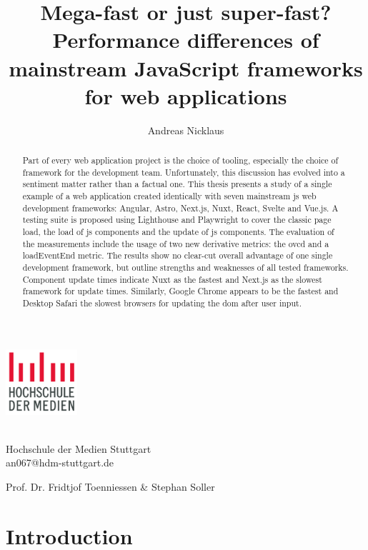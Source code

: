 \documentclass[a4paper, 12pt]{article}
\title{Mega-fast or just super-fast? Performance differences of mainstream JavaScript frameworks for web applications}
\author{Andreas Nicklaus}
\makeatletter
\let\Title\@title
\let\Author\@author
\makeatother
\begin{document}
\begin{center}
  \includegraphics[width=100px, keepaspectratio]{img/hdm-logo.png}
\end{center}	
  
\vspace{20px}
\noindent{\Large\bfseries \Title}
\vspace{10px}

\noindent\textbf{\Author}\\
Hochschule der Medien Stuttgart\\
an067@hdm-stuttgart.de 

\vspace{10px}
\noindent Prof. Dr. Fridtjof Toenniessen \& Stephan Soller

\begin{abstract}
  Part of every web application project is the choice of tooling, especially the choice of framework for the development team.
  Unfortunately, this discussion has evolved into a sentiment matter rather than a factual one.
  This thesis presents a study of a single example of a web application created identically with seven mainstream \acrlong{js} web development frameworks: Angular, Astro, Next.js, Nuxt, React, Svelte and Vue.js.
  A testing suite is proposed using Lighthouse and Playwright to cover the classic page load, the load of \acrlong{js} components and the update of \acrlong{js} components.
  The evaluation of the measurements include the usage of two new derivative metrics: the \acrfull{ovcd} and a loadEventEnd metric.
  The results show no clear-cut overall advantage of one single development framework, but outline strengths and weaknesses of all tested frameworks.
  Component update times indicate Nuxt as the fastest and Next.js as the slowest framework for update times.
  Similarly, Google Chrome appears to be the fastest and Desktop Safari the slowest browsers for updating the \acrshort{dom} after user input. 
\end{abstract}


\section{Introduction}
\end{document}
